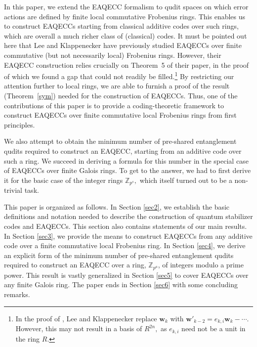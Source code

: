 \documentclass{article}
\def\Z{\mathbb{Z}}
\theoremstyle{remark}
\theoremstyle{definition}
\numberwithin{equation}{section}
\begin{document}
In this paper, we extend the EAQECC formalism to qudit spaces on which error actions are defined by finite local commutative Frobenius rings. This enables us to construct EAQECCs starting from classical additive codes over such rings, which are overall a much richer class of (classical) codes. It must be pointed out here that Lee and Klappenecker \cite{lee} have previously studied EAQECCs over finite commutative (but not necessarily local) Frobenius rings. However, their EAQECC construction relies crucially on Theorem~5 of their paper, in the proof of which we found a gap that could not readily be filled.\footnote{In the proof of \cite[Theorem 5]{lee}, Lee and Klappenecker replace $\mathbf{w}_k$ with $\mathbf{w}'_{k-2} = e_{k,i} \mathbf{w}_k - \cdots $. However, this may not result in a basis of $R^{2n},$ as $e_{k,i}$ need not be a unit in the ring $R$.}  By restricting our attention further to local rings, we are able to furnish a proof of the result (Theorem~\ref{sym}) needed for the construction of EAQECCs. Thus, one of the contributions of this paper is to provide a coding-theoretic framework to construct EAQECCs over finite commutative local Frobenius rings from first principles. 

We also attempt to obtain the minimum number of pre-shared entanglement qudits required to construct an EAQECC, starting from an additive code over such a ring. We succeed in deriving a formula for this number in the special case of EAQECCs over finite Galois rings. To get to the answer, we had to first derive it for the basic case of the integer rings $\Z_{p^s},$ which itself turned out to be a non-trivial task. 

This paper is organized as follows. In Section \ref{sec2}, we establish the basic definitions and notation needed to describe the construction of quantum stabilizer codes and EAQECCs. This section also contains statements of our main results.  In Section \ref{sec3}, we provide the means to construct EAQECCs from any additive code over a finite commutative local Frobenius ring. In Section \ref{sec4}, we derive an explicit form of the minimum number of pre-shared entanglement qudits required to construct an EAQECC over a ring, $\Z_{p^a}$, of integers modulo a prime power. This result is vastly generalized in Section \ref{sec5} to cover EAQECCs over any finite Galois ring. The paper ends in Section \ref{sec6} with some concluding remarks.
\end{document}

